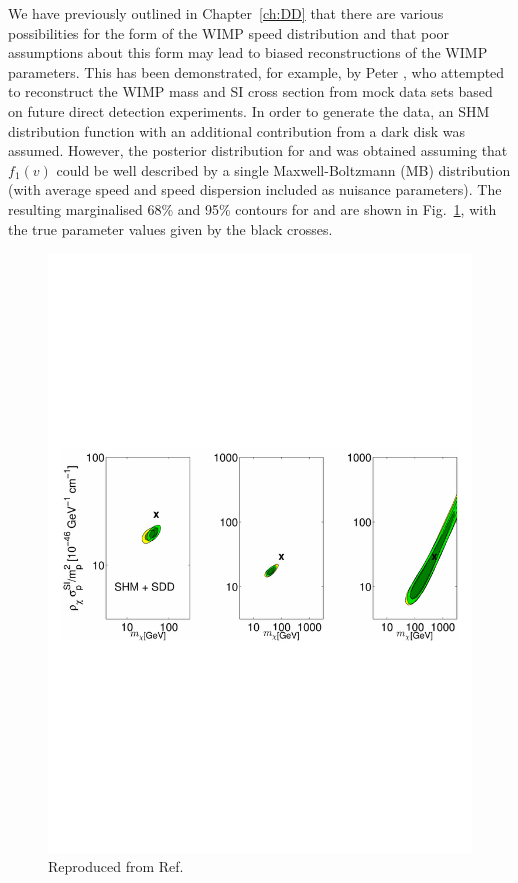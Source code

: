 We have previously outlined in Chapter~\ref{ch:DD} that there are various possibilities for the form of the WIMP speed distribution and that poor assumptions about this form may lead to biased reconstructions of the WIMP parameters. This has been demonstrated, for example, by Peter \cite{Peter:2011}, who attempted to reconstruct the WIMP mass and SI cross section from mock data sets based on future direct detection experiments. In order to generate the data, an SHM distribution function with an additional contribution from a dark disk was assumed. However, the posterior distribution for \mchi and \sigmapsi was obtained assuming that $f_1(v)$ could be well described by a single Maxwell-Boltzmann (MB) distribution (with average speed and speed dispersion included as nuisance parameters). The resulting marginalised 68\% and 95\% contours for \mchi and \sigmapsi are shown in Fig.~\ref{fig:Speed:PeterRecon}, with the true parameter values given by the black crosses.

\begin{figure}[h]
  \includegraphics[trim={0cm 9cm 0cm 9cm},clip,width=\textwidth]{Speed/PeterRecon.pdf}
  \caption[Biased reconstruction of WIMP parameters]{ Reproduced from Ref.~\cite{Peter:2011}}
  \label{fig:Speed:PeterRecon}
\end{figure}

